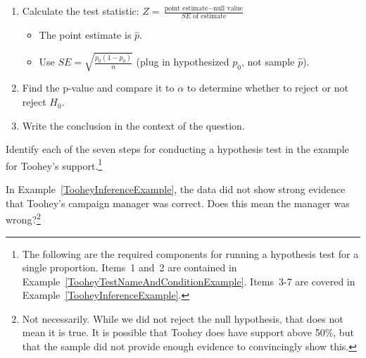 \begin{termBox}
{\begin{enumerate}
\vspace{-1.5mm}
\item Calculate the test statistic: $Z = \frac{\text{point estimate} - \text{null value}}{SE \text{ of estimate}}$
  \begin{itemize}
  \item The point estimate is $\hat{p}$.
  \item Use $SE = \sqrt{\frac{p_0(1-p_0)}{n}}$ \quad(plug in hypothesized $p_0$, not sample $\hat{p}$).
  \end{itemize}
\item Find the p-value and compare it to $\alpha$ to determine whether to reject or not reject $H_0$.
\item Write the conclusion in the context of the question.
\end{enumerate}}
\end{termBox}

\begin{exercise}
Identify each of the seven steps for conducting a hypothesis test in the example for Toohey's support.\footnote{The following are the required components for running a hypothesis test for a single proportion. Items~1 and~2 are contained in Example~\ref{TooheyTestNameAndConditionExample}. Items~3-7 are covered in Example~\ref{TooheyInferenceExample}.}
\end{exercise}

\begin{exercise}
In Example~\ref{TooheyInferenceExample}, the data did not show strong evidence that Toohey's campaign manager was correct. Does this mean the manager was wrong?\footnote{Not necessarily. While we did not reject the null hypothesis, that does not mean it is true. It is possible that Toohey does have support above 50\%, but that the sample did not provide enough evidence to convincingly show this.}
\end{exercise}

